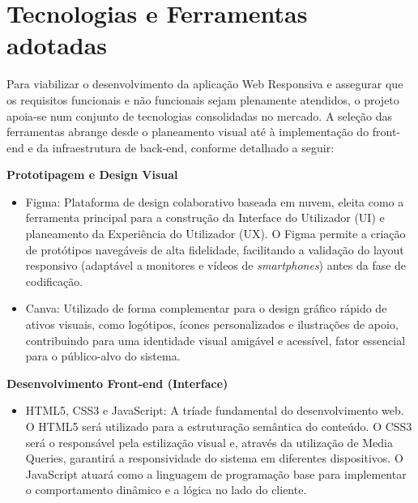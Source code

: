 \vspace{0.5cm}
\section{Tecnologias e Ferramentas adotadas}

Para viabilizar o desenvolvimento da aplicação Web Responsiva e assegurar que os requisitos funcionais e não funcionais sejam plenamente atendidos, o projeto apoia-se num conjunto de tecnologias consolidadas no mercado. A seleção das ferramentas abrange desde o planeamento visual até à implementação do front-end e da infraestrutura de back-end, conforme detalhado a seguir:

\vspace{0.3cm}
\noindent\textbf {Prototipagem e Design Visual}

\begin{itemize}
    \item Figma: Plataforma de design colaborativo baseada em nuvem, eleita como a ferramenta principal para a construção da Interface do Utilizador (UI) e planeamento da Experiência do Utilizador (UX). O Figma permite a criação de protótipos navegáveis de alta fidelidade, facilitando a validação do layout responsivo (adaptável a monitores e vídeos de \textit{smartphones}) antes da fase de codificação.
\end{itemize}

\begin{itemize}
    \item Canva: Utilizado de forma complementar para o design gráfico rápido de ativos visuais, como logótipos, ícones personalizados e ilustrações de apoio, contribuindo para uma identidade visual amigável e acessível, fator essencial para o público-alvo do sistema.
\end{itemize}

\vspace{0.3cm}
\noindent \textbf{Desenvolvimento Front-end (Interface)}

\begin{itemize}
    \item HTML5, CSS3 e JavaScript: A tríade fundamental do desenvolvimento web. O HTML5 será utilizado para a estruturação semântica do conteúdo. O CSS3 será o responsável pela estilização visual e, através da utilização de Media Queries, garantirá a responsividade do sistema em diferentes dispositivos. O JavaScript atuará como a linguagem de programação base para implementar o comportamento dinâmico e a lógica no lado do cliente.
\end{itemize}

